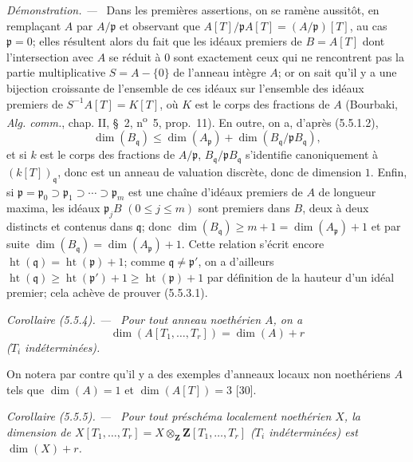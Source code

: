 \documentclass[10pt,oneside]{book}
\makeatletter
\newenvironment{corollary}[1][]{%
  \par\medskip\noindent\itshape Corollaire (#1). ---\ }{\par}
\newenvironment{proof}{%
  \par\medskip\noindent\textit{Démonstration. ---\ }}{\par}
\newcommand{\EGAReaderTarget}[2]{\hypertarget{#1}{}\@bsphack\begingroup\def\@currentHref{#1}\label{#2}\endgroup\@esphack}
\makeatother
\begin{document}
\begin{proof}
Dans les premières assertions, on se ramène aussitôt, en remplaçant $A$ par
$A/\mathfrak p$ et observant que
$A[T]/\mathfrak pA[T]=(A/\mathfrak p)[T]$, au cas $\mathfrak p=0$; elles
résultent alors du fait que les idéaux premiers de $B=A[T]$ dont
l'intersection avec $A$ se réduit à $0$ sont exactement ceux qui ne
rencontrent pas la partie multiplicative $S=A-\{0\}$ de l'anneau intègre
$A$; or on sait qu'il y a une bijection croissante de l'ensemble de ces
idéaux sur l'ensemble des idéaux premiers de $S^{-1}A[T]=K[T]$, où $K$ est
le corps des fractions de $A$ (Bourbaki, \emph{Alg. comm.}, chap. II,
\S~2, n\textsuperscript{o}~5, prop.~11). En outre, on a, d'après (5.5.1.2),
\[
\dim(B_{\mathfrak q})\leq\dim(A_{\mathfrak p})
+\dim(B_{\mathfrak q}/\mathfrak pB_{\mathfrak q}),
\]
et si $k$ est le corps des fractions de $A/\mathfrak p$,
$B_{\mathfrak q}/\mathfrak pB_{\mathfrak q}$ s'identifie canoniquement à
$(k[T])_{\mathfrak q}$, donc est un anneau de valuation discrète, donc de
dimension $1$. Enfin, si
$\mathfrak p=\mathfrak p_0\supset\mathfrak p_1\supset\cdots
\supset\mathfrak p_m$ est une chaîne d'idéaux premiers de $A$ de longueur
maxima, les idéaux $\mathfrak p_jB$ $(0\leq j\leq m)$ sont premiers dans
$B$, deux à deux distincts et contenus dans $\mathfrak q$; donc
$\dim(B_{\mathfrak q})\geq m+1=\dim(A_{\mathfrak p})+1$ et par suite
$\dim(B_{\mathfrak q})=\dim(A_{\mathfrak p})+1$. Cette relation s'écrit
encore $\operatorname{ht}(\mathfrak q)=\operatorname{ht}(\mathfrak p)+1$;
comme $\mathfrak q\ne\mathfrak p'$, on a d'ailleurs
$\operatorname{ht}(\mathfrak q)\geq\operatorname{ht}(\mathfrak p')+1
\geq\operatorname{ht}(\mathfrak p)+1$ par définition de la hauteur d'un
idéal premier; cela achève de prouver (5.5.3.1).
\end{proof}

\begin{corollary}[5.5.4]
\EGAReaderTarget{ega4.c04.cor.5-5-4}{IV.2.s5.5.4-fr}
Pour tout anneau noethérien $A$, on a
\begin{equation}
\dim(A[T_1,\ldots,T_r])=\dim(A)+r
\tag{5.5.4.1}\label{IV.2.s5.5.4.1-fr}
\end{equation}
($T_i$ indéterminées).
\end{corollary}

On notera par contre qu'il y a des exemples d'anneaux locaux non noethériens
$A$ tels que $\dim(A)=1$ et $\dim(A[T])=3$ [30].

\begin{corollary}[5.5.5]
\label{IV.2.s5.5.5-fr}
Pour tout préschéma localement noethérien $X$, la dimension de
$X[T_1,\ldots,T_r]=X\otimes_{\mathbf Z}\mathbf Z[T_1,\ldots,T_r]$
($T_i$ indéterminées) est $\dim(X)+r$.
\end{corollary}
\end{document}
